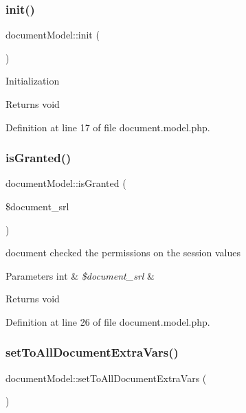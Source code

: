 \subsubsection{\texorpdfstring{init()}{init()}}
{\footnotesize\ttfamily document\+Model\+::init (\begin{DoxyParamCaption}{ }\end{DoxyParamCaption})}

Initialization \begin{DoxyReturn}{Returns}
void 
\end{DoxyReturn}


Definition at line 17 of file document.\+model.\+php.

\hypertarget{classdocumentModel_acca118289b1b6e55c73dc21b7ed32d9c}{}\label{classdocumentModel_acca118289b1b6e55c73dc21b7ed32d9c} 
\subsubsection{\texorpdfstring{is\+Granted()}{isGranted()}}
{\footnotesize\ttfamily document\+Model\+::is\+Granted (\begin{DoxyParamCaption}\item[{}]{\$document\+\_\+srl }\end{DoxyParamCaption})}

document checked the permissions on the session values 
\begin{DoxyParams}[1]{Parameters}
int & {\em \$document\+\_\+srl} & \\
\hline
\end{DoxyParams}
\begin{DoxyReturn}{Returns}
void 
\end{DoxyReturn}


Definition at line 26 of file document.\+model.\+php.

\hypertarget{classdocumentModel_a030147f71d77bdf6cf23798a2264445b}{}\label{classdocumentModel_a030147f71d77bdf6cf23798a2264445b} 
\subsubsection{\texorpdfstring{set\+To\+All\+Document\+Extra\+Vars()}{setToAllDocumentExtraVars()}}
{\footnotesize\ttfamily document\+Model\+::set\+To\+All\+Document\+Extra\+Vars (\begin{DoxyParamCaption}{ }\end{DoxyParamCaption})}

